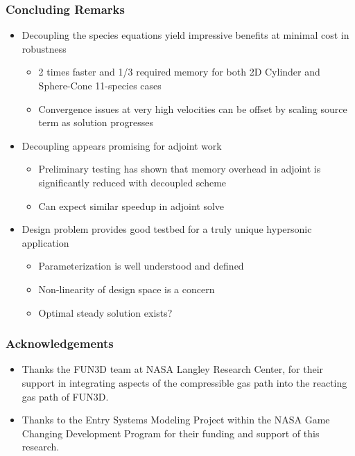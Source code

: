 \documentclass{beamer}
\begin{document}
\begin{frame}
  \frametitle{Concluding Remarks}
  \begin{itemize}
    \item Decoupling the species equations yield impressive benefits at minimal cost in robustness
      \begin{itemize}
        \item 2 times faster and 1/3 required memory for both 2D Cylinder and
          Sphere-Cone 11-species cases
        \item Convergence issues at very high velocities can be offset by
          scaling source term as solution progresses
      \end{itemize}
      \item Decoupling appears promising for adjoint work
        \begin{itemize}
          \item Preliminary testing has shown that memory overhead in adjoint is
            significantly reduced with decoupled scheme
          \item Can expect similar speedup in adjoint solve
        \end{itemize}
      \item Design problem provides good testbed for a truly unique hypersonic
        application
        \begin{itemize}
          \item Parameterization is well understood and defined
          \item Non-linearity of design space is a concern
          \item Optimal steady solution exists?
        \end{itemize}
  \end{itemize}
\end{frame}
\begin{frame}
  \frametitle{Acknowledgements}
  \begin{itemize}
    \item Thanks the FUN3D team at NASA Langley Research Center, for their
      support in integrating aspects of the compressible gas path into the
      reacting gas path of FUN3D.
   \item Thanks to the Entry Systems Modeling Project within the NASA
     Game Changing Development Program for their funding and support of this research.  
  \end{itemize}
\end{frame}
\end{document}
